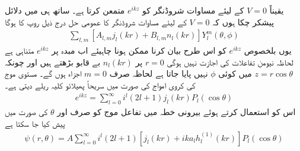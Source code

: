 یقیناً \(V=0\) کے لیئے مساوات شروڈنگر کو \(e^{ikz}\) متمعن کرتا ہے۔ ساتھ ہی میں دلائل پیشکر چکا ہوں کہ \(V=0\) کے لیئے مساوات شروڈنگر کا عمومی حل درج ذیل روپ کا ہوگا
\begin{align*}
	\sum_{l, m}\left[A_{l, m}j_l(kr)+B_{l, m}n_l(kr)\right]Y_l^m(\theta, \phi)
\end{align*}
یوں بلخصوص \(e^{ikz}\) کو اس طرح بیان کرنا ممکن ہونا چاہیئے اب مبدہ پر \(e^{ikz}\) متناہی ہے لحاظہ نیومن تفاعلات کی اجازت نہیں ہوگی \(r=0\) پر \(n_l(kr)\) بے قابو بڑھتے ہیں اور چونکہ \(z=r\cos\theta\) میں کوئی \(\phi\) نہیں پایا جاتا ہے لحاظہ صرف \(m=0\) اجزاء ہوں گے۔ مستوی موج کی کروی امواج کی صورت میں سریحاً پھیلائو کلیہ ریلے دیتی ہے۔
\begin{align}
	e^{ikz} = \sum_{l=0}^{\infty}i^l(2l+1)j_l(kr)P_l(\cos\theta)
\end{align}
اس کو استعمال کرتے ہوئے بیرونی خطہ میں تفاعل موج کو صرف  اور \(\theta\) کی صورت میں پیش کیا جا سکتا ہے
\begin{align}
	\psi(r, \theta) = A\sum_{l=0}^{\infty}i^l(2l+1)\left[j_l(kr)+ika_lh_l^{(1)}(kr)\right]P_l(\cos\theta)
\end{align}

